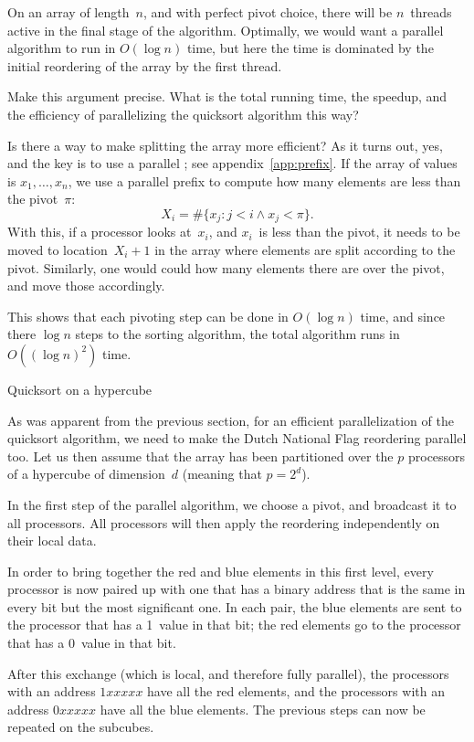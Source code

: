 On an array of length~$n$, and with perfect pivot choice, there will
be $n$~threads active in the final stage of the algorithm. Optimally,
we would want a parallel algorithm to run in $O(\log n)$ time, but
here the time is dominated by the initial reordering of the array by
the first thread.

\begin{exercise}
  Make this argument precise. What is the total running time, the
  speedup, and the efficiency of parallelizing the quicksort algorithm
  this way?
\end{exercise}

Is there a way to make splitting the array more efficient?
As it turns out, yes, and the key is to use a parallel ; see appendix~\ref{app:prefix}. If the array of values
is $x_1,\ldots,x_n$, we use a parallel prefix to compute
how many elements are less than the pivot~$\pi$:
\[ X_i=\#\{ x_j\colon j<i\wedge x_j<\pi \}. \]
With this, if a processor looks at~$x_i$, and $x_i$~is less
than the pivot, it needs to be moved to location~$X_i+1$
in the array where elements are split according to the pivot.
%
Similarly, one would could how many elements there are over the pivot,
and move those accordingly.

This shows that each pivoting step can be done in $O(\log n)$ time,
and since there $\log n$ steps to the sorting algorithm, the
total algorithm runs in $O((\log n)^2)$ time.

 {Quicksort on a hypercube}

As was apparent from the previous section, for an efficient
parallelization of the quicksort algorithm, we need to make the Dutch
National Flag reordering parallel too. Let us then assume that the
array has been partitioned over the $p$ processors of a hypercube of
dimension~$d$ (meaning that $p=2^d$).

In the first step of the parallel algorithm, we choose a pivot, and
broadcast it to all processors. All processors will then apply the
reordering independently on their local data. 

In order to bring together the red and blue elements in this first
level, every processor is now paired up with one that has a binary
address that is the same in every bit but the most significant one. In
each pair, the blue elements are sent to the processor that has a
1~value in that bit; the red elements go to the processor that has a
0~value in that bit.

After this exchange (which is local, and therefore fully parallel),
the processors with an address $1xxxxx$ have all the red elements, and
the processors with an address $0xxxxx$ have all the blue
elements. The previous steps can now be repeated on the subcubes.

